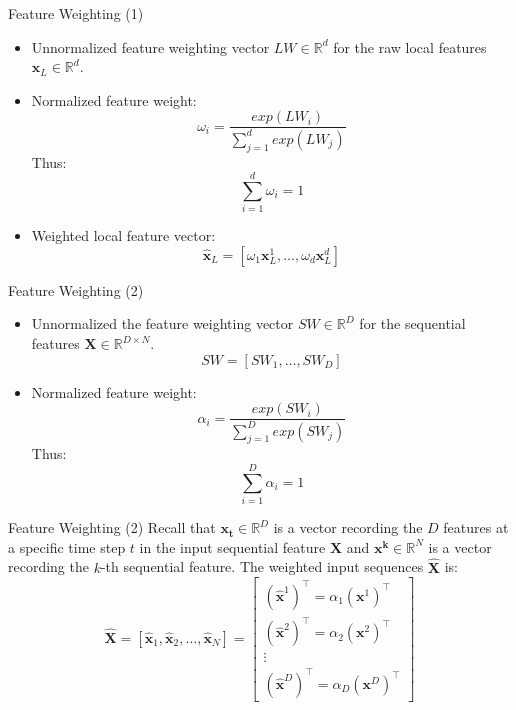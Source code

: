 \documentclass[10pt,table,mathserif]{beamer}
\newcommand{\vx}{\mathbf{x}}
\newcommand{\Real}{\mathbb{R}}
\begin{document}
\begin{frame}[fragile]{Feature Weighting (1)}
\begin{itemize}
\item
Unnormalized feature weighting vector $LW \in \Real^{d}$ for the raw local features $\vx_L \in \Real^d$.
\item Normalized feature weight:
\[
\omega_i=\frac{exp(LW_i)}{\sum_{j=1}^{d} exp(LW_j)}
\]
Thus:
\[
\sum_{i=1}^{d} \omega_i=1
\]
\item
Weighted local feature vector:
\[\hat{\vx}_L =[\omega_1 \vx_L^1,\dots, \omega_d \vx_L^d]\]
\end{itemize}
\end{frame}

\begin{frame}[fragile]{Feature Weighting (2)}
\begin{itemize}
\item
Unnormalized the feature weighting vector $SW \in \Real^{D}$ for the sequential  features $\mathbf{X} \in \Real^{D \times N}$.
\[
SW=[SW_1, \dots, SW_D]
\]
\item
Normalized feature weight:
\[
\alpha_i=\frac{exp(SW_i)}{\sum_{j=1}^{D} exp(SW_j)}
\]
Thus:
\[
\sum_{i=1}^{D} \alpha_i=1
\]
\end{itemize}
\end{frame}

\begin{frame}[fragile]{Feature Weighting (2)}
Recall that $\mathbf{{x_t}} \in \Real^{D}$ is a vector recording the $D$ features at a specific time step $t$ in the input sequential feature $\mathbf{X}$ and $\mathbf{{x^k}} \in \Real^{N}$ is a vector recording the $k$-th sequential feature.  The weighted input sequences $\hat{\mathbf{X}}$ is:
\[
\hat{\mathbf{X}}=\left[\hat{\vx}_1,\hat{\vx}_2,\dots,\hat{\vx}_N\right]=\left[
\begin{array}{c}
( \hat{\vx}^1)^{\top} = \alpha_1 ( {\vx^1})^{\top} \\
(\hat{\vx}^2)^{\top} = \alpha_2 ( {\vx^2})^{\top}  \\
\vdots \\
(\hat{\vx}^D)^{\top} = \alpha_D ( {\vx^D})^{\top}
\end{array}
\right]
\]

\end{frame}
\end{document}
